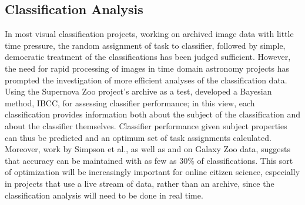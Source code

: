 \documentclass{ar2e}
\begin{document}

\subsection{Classification Analysis}
\label{sec:class:analysis}

In most visual classification projects, working on archived image data with
little time pressure, the random assignment of task to classifier, followed by
simple, democratic treatment of the classifications has been judged sufficient.
However, the need for rapid processing of images in time domain astronomy
projects has prompted the investigation of more efficient analyses of the
classification data.  Using the Supernova Zoo project's archive as a test,
\citet{Simpson++2012IBCC} developed a Bayesian method, IBCC, for assessing
classifier performance; in this view, each classification provides information
both about the subject of the classification and about the classifier
themselves. Classifier performance given subject properties can thus be
predicted and an optimum set of task assignments calculated. 
Moreover, work by Simpson et al., as well as \citet{Kamar} and \citet{Waterhouse} on
Galaxy Zoo data, suggests that accuracy can be maintained with as few as 30\% of
classifications. 
This sort of optimization will be increasingly important for online citizen
science, especially in projects that use a live stream of data, rather than
an archive, since the classification analysis will need to be done in real time.

\end{document}
